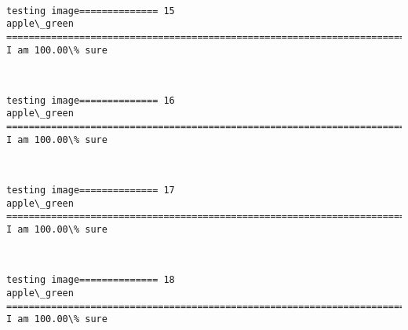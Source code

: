 \documentclass[11pt]{article}
\begin{document}
    \begin{center}
    \end{center}
    { \hspace*{\fill} \\}
    
    \begin{Verbatim}[commandchars=\\\{\}]
testing image============== 15
apple\_green
============================================================================
I am 100.00\% sure

    \end{Verbatim}

    \begin{center}
    \end{center}
    { \hspace*{\fill} \\}
    
    \begin{Verbatim}[commandchars=\\\{\}]
testing image============== 16
apple\_green
============================================================================
I am 100.00\% sure

    \end{Verbatim}

    \begin{center}
    \end{center}
    { \hspace*{\fill} \\}
    
    \begin{Verbatim}[commandchars=\\\{\}]
testing image============== 17
apple\_green
============================================================================
I am 100.00\% sure

    \end{Verbatim}

    \begin{center}
    \end{center}
    { \hspace*{\fill} \\}
    
    \begin{Verbatim}[commandchars=\\\{\}]
testing image============== 18
apple\_green
============================================================================
I am 100.00\% sure

    \end{Verbatim}
\end{document}

